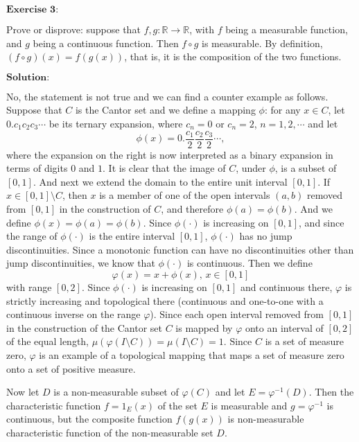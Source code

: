 \documentclass[12pt]{article}
\begin{document}
\newpage

$\textbf{Exercise 3:}$

Prove or disprove: suppose that $f, g: \mathbb{R} \rightarrow \mathbb{R}$, with $f$ being a measurable function, and $g$ being a continuous function. Then $f \circ g$ is measurable. By definition, $(f \circ g)(x) = f(g(x))$, that is, it is the composition of the two functions.


\vspace{8pt}
$\textbf{Solution:}$

No, the statement is not true and we can find a counter example as follows. Suppose that $C$ is the Cantor set and we define a mapping $\phi$: for any $x \in C$, let $0.c_{1}c_{2}c_{3} \cdots$ be its ternary expansion, where $c_{n} = 0$ or $c_{n} = 2$, $n = 1, 2, \cdots$ and let
\begin{equation*}
    \phi(x) = 0.\frac{c_{1}}{2}\frac{c_{2}}{2}\frac{c_{3}}{2}\cdots,
\end{equation*}
where the expansion on the right is now interpreted as a binary expansion in terms of digits $0$ and $1$. It is clear that the image of $C$, under $\phi$, is a subset of $[0, 1]$. And next we extend the domain to the entire unit interval $[0, 1]$. If $x \in [0, 1] \setminus C $, then $x$ is a member of one of the open intervals $(a, b)$ removed from $[0, 1]$ in the construction of $C$, and therefore $\phi(a) = \phi(b)$. And we define $\phi(x) = \phi(a) = \phi(b)$. Since $\phi(\cdot)$ is increasing on $[0, 1]$, and since the range of $\phi(\cdot)$ is the entire interval $[0, 1]$, $\phi(\cdot)$ has no jump discontinuities. Since a monotonic function can have no discontinuities other than jump discontinuities, we know that $\phi(\cdot)$ is continuous. Then we define
$$\varphi (x) = x + \phi(x), \, x \in [0, 1]$$
with range $[0, 2]$. Since $\phi(\cdot)$ is increasing on $[0, 1]$ and continuous there, $\varphi$ is strictly increasing and topological there (continuous and one-to-one with a continuous inverse on the range $\varphi$). Since each open interval removed from $[0,1]$ in the construction of the Cantor set $C$ is mapped by $\varphi$ onto an interval of $[0, 2]$ of the equal length, $\mu(\varphi(I \setminus C)) = \mu(I \setminus C) = 1$. Since $C$ is a set of measure zero, $\varphi$ is an example of a topological mapping that maps a set of measure zero onto a set of positive measure.

Now let $D$ is a non-measurable subset of $\varphi(C)$ and let $E = \varphi^{-1}(D)$. Then the characteristic function $f = 1_{E}(x)$ of the set $E$ is measurable and $g = \varphi^{-1}$ is continuous, but the composite function $f(g(x))$ is non-measurable characteristic function of the non-measurable set $D$.
\end{document}
